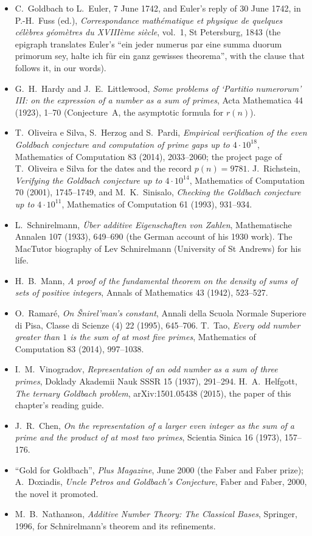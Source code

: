 \begin{itemize}
\item C.~Goldbach to L.~Euler, 7 June 1742, and Euler's reply of 30 June 1742, in P.-H.~Fuss (ed.), \emph{Correspondance math\'ematique et physique de
quelques c\'el\`ebres g\'eom\`etres du XVIII\`eme si\`ecle}, vol.~1, St Petersburg, 1843 (the epigraph translates Euler's ``ein jeder numerus par eine summa
duorum primorum sey, halte ich f\"ur ein ganz gewisses theorema'', with the clause that follows it, in our words).
\item G.~H.~Hardy and J.~E.~Littlewood, \emph{Some problems of `Partitio numerorum' III: on the expression of a number as a sum of primes}, Acta
Mathematica 44 (1923), 1--70 (Conjecture~A, the asymptotic formula for $r(n)$).
\item T.~Oliveira e Silva, S.~Herzog and S.~Pardi, \emph{Empirical verification of the even Goldbach conjecture and computation of prime gaps up to
$4\cdot10^{18}$}, Mathematics of Computation 83 (2014), 2033--2060; the project page of T.~Oliveira e Silva for the dates and the record $p(n)=9781$.
J.~Richstein, \emph{Verifying the Goldbach conjecture up to $4\cdot10^{14}$}, Mathematics of Computation 70 (2001), 1745--1749, and M.~K.~Sinisalo,
\emph{Checking the Goldbach conjecture up to $4\cdot10^{11}$}, Mathematics of Computation 61 (1993), 931--934.
\item L.~Schnirelmann, \emph{\"Uber additive Eigenschaften von Zahlen}, Mathematische Annalen 107 (1933), 649--690 (the German account of his 1930 work).
The MacTutor biography of Lev Schnirelmann (University of St Andrews) for his life.
\item H.~B.~Mann, \emph{A proof of the fundamental theorem on the density of sums of sets of positive integers}, Annals of Mathematics 43 (1942),
523--527.
\item O.~Ramar\'e, \emph{On \v{S}nirel'man's constant}, Annali della Scuola Normale Superiore di Pisa, Classe di Scienze (4) 22 (1995), 645--706.
T.~Tao, \emph{Every odd number greater than $1$ is the sum of at most five primes}, Mathematics of Computation 83 (2014), 997--1038.
\item I.~M.~Vinogradov, \emph{Representation of an odd number as a sum of three primes}, Doklady Akademii Nauk SSSR 15 (1937), 291--294.
H.~A.~Helfgott, \emph{The ternary Goldbach problem}, arXiv:1501.05438 (2015), the paper of this chapter's reading guide.
\item J.~R.~Chen, \emph{On the representation of a larger even integer as the sum of a prime and the product of at most two primes}, Scientia Sinica 16
(1973), 157--176.
\item ``Gold for Goldbach'', \emph{Plus Magazine}, June 2000 (the Faber and Faber prize); A.~Doxiadis, \emph{Uncle Petros and Goldbach's Conjecture},
Faber and Faber, 2000, the novel it promoted.
\item M.~B.~Nathanson, \emph{Additive Number Theory: The Classical Bases}, Springer, 1996, for Schnirelmann's theorem and its refinements.
\end{itemize}
